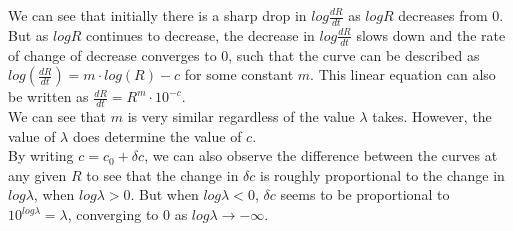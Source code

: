 \documentclass[10pt]{article}
\begin{document}
We can see that initially there is a sharp drop in $log \frac{dR}{dt}$ as $log R$ decreases from 0. But as $log R$ continues to decrease, the decrease in $log \frac{dR}{dt}$ slows down and the rate of change of decrease converges to 0, such that the curve can be described as $log(\frac{dR}{dt})= m \cdot log(R) - c$ for some constant $m$. This linear equation can also be written as $\frac{dR}{dt}=R^m\cdot 10^{-c}$.\\
We can see that $m$ is very similar regardless of the value $\lambda$ takes. However, the value of $\lambda$ does determine the value of $c$. \\
By writing $c=c_0 + \delta c$, we can also observe the difference between the curves at any given $R$ to see that the change in $\delta c$ is roughly proportional to the change in $log \lambda$, when $log\lambda >0$. But when $log\lambda <0$, $\delta c$ seems to be proportional to $10^{log \lambda}=\lambda$, converging to 0 as $log\lambda \to -\infty$.
\end{document}
